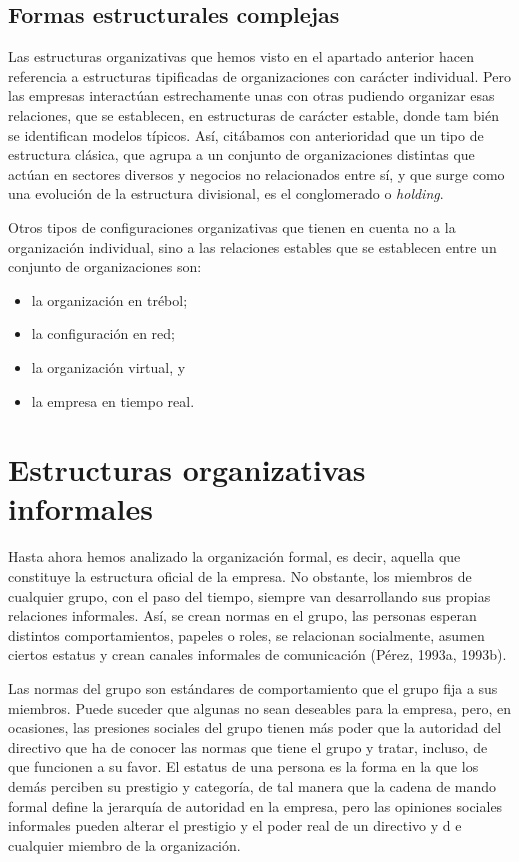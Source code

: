 \documentclass[
]{krantz}
\providecommand{\tightlist}{%
  \setlength{\itemsep}{0pt}\setlength{\parskip}{0pt}}
\begin{document}
\hypertarget{formas-estructurales-complejas}{%
\subsection{Formas estructurales complejas}\label{formas-estructurales-complejas}}

Las estructuras organizativas que hemos visto en el apartado anterior hacen referencia a estructuras tipificadas de organizaciones con carácter individual. Pero las empresas interactúan estrechamente unas con otras pudiendo organizar esas relaciones, que se establecen, en estructuras de carácter estable, donde tam bién se identifican modelos típicos. Así, citábamos con anterioridad que un tipo de estructura clásica, que agrupa a un conjunto de organizaciones distintas que actúan en sectores diversos y negocios no relacionados entre sí, y que surge como una evolución de la estructura divisional, es el conglomerado o \emph{holding}.

Otros tipos de configuraciones organizativas que tienen en cuenta no a la organización individual, sino a las relaciones estables que se establecen entre un conjunto de organizaciones son:

\begin{itemize}
\tightlist
\item
  la organización en trébol;
\item
  la configuración en red;
\item
  la organización virtual, y
\item
  la empresa en tiempo real.
\end{itemize}

\hypertarget{estructuras-organizativas-informales}{%
\section{Estructuras organizativas informales}\label{estructuras-organizativas-informales}}

Hasta ahora hemos analizado la organización formal, es decir, aquella que constituye la estructura oficial de la empresa. No obstante, los miembros de cualquier grupo, con el paso del tiempo, siempre van desarrollando sus propias relaciones informales. Así, se crean normas en el grupo, las personas esperan distintos comportamientos, papeles o roles, se relacionan socialmente, asumen ciertos estatus y crean canales informales de comunicación (Pérez, 1993a, 1993b).

Las normas del grupo son estándares de comportamiento que el grupo fija a sus miembros. Puede suceder que algunas no sean deseables para la empresa, pero, en ocasiones, las presiones sociales del grupo tienen más poder que la autoridad del directivo que ha de conocer las normas que tiene el grupo y tratar, incluso, de que funcionen a su favor. El estatus de una persona es la forma en la que los demás perciben su prestigio y categoría, de tal manera que la cadena de mando formal define la jerarquía de autoridad en la empresa, pero las opiniones sociales informales pueden alterar el prestigio y el poder real de un directivo y d e cualquier miembro de la organización.
\end{document}
